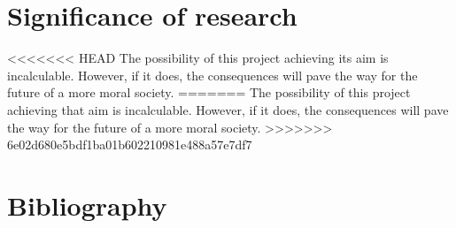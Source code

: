 \documentclass[12pt]{article}
\begin{document}
\section*{Significance of research}
<<<<<<< HEAD
The possibility of this project achieving its aim is incalculable. However, if it does, the consequences will pave the way for the future of a more moral society.
=======
The possibility of this project achieving that aim is incalculable. However, if it does, the consequences will pave the way for the future of a more moral society.
>>>>>>> 6e02d680e5bdf1ba01b602210981e488a57e7df7

\section*{Bibliography}

\end{document}
